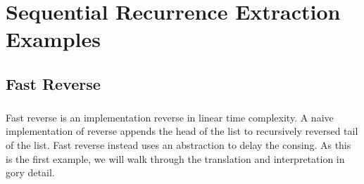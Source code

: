 \chapter{Sequential Recurrence Extraction Examples}
\section{Fast Reverse}
\paragraph{}
Fast reverse is an implementation reverse in linear time complexity.
A naive implementation of reverse appends the head of the list to recursively
reversed tail of  the list. Fast reverse instead uses an abstraction to delay
the consing. As this is the first example, we will walk through the translation
and interpretation in gory detail.


